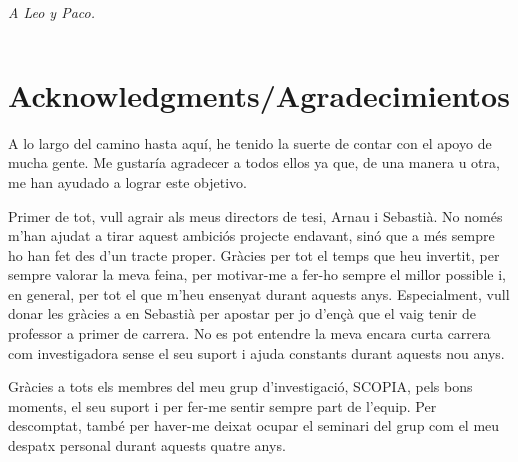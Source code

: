 \documentclass[
    colorlinks, 
    libertine,
]{uninathesis}
\theoremstyle{plain}
\begin{document}



\thispagestyle{empty}

\newpage $\ $


\frontmatter


\newpage $\ $

\thispagestyle{empty}


\newpage $\ $


\thispagestyle{empty}

\vspace*{2 in}

\begin{flushright}
	\textit{A Leo y Paco.}
\end{flushright}

\newpage $\ $

\thispagestyle{empty}




\chapter*{Acknowledgments/Agradecimientos}

A lo largo del camino hasta aquí, he tenido la suerte de contar con el apoyo de mucha gente. Me gustaría agradecer a todos ellos ya que, de una manera u otra, me han ayudado a lograr este objetivo.

Primer de tot, vull agrair als meus directors de tesi, Arnau i Sebastià. No només m'han ajudat a tirar aquest ambiciós projecte endavant, sinó que a més sempre ho han fet des d'un tracte proper. Gràcies per tot el temps que heu invertit, per sempre valorar la meva feina, per motivar-me a fer-ho sempre el millor possible i, en general, per tot el que m'heu ensenyat durant aquests anys. Especialment, vull donar les gràcies a en Sebastià per apostar per jo d'ençà que el vaig tenir de professor a primer de carrera. No es pot entendre la meva encara curta carrera com investigadora sense el seu suport i ajuda constants durant aquests nou anys.

Gràcies a tots els membres del meu grup d'investigació, SCOPIA, pels bons moments, el seu suport i per fer-me sentir sempre part de l'equip. Per descomptat, també per haver-me deixat ocupar el seminari del grup com el meu despatx personal durant aquests quatre anys.
\end{document}
